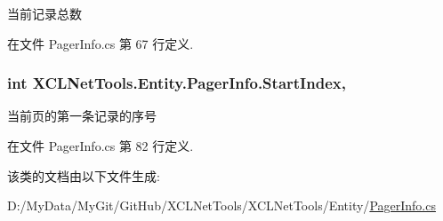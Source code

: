 当前记录总数 



在文件 Pager\-Info.\-cs 第 67 行定义.

\hypertarget{class_x_c_l_net_tools_1_1_entity_1_1_pager_info_a659b36bf635a3fed41ee3b82ec4c2cbe}{
\subsubsection[{Start\-Index}]{\setlength{\rightskip}{0pt plus 5cm}int X\-C\-L\-Net\-Tools.\-Entity.\-Pager\-Info.\-Start\-Index\hspace{0.3cm}{\ttfamily [get]}, {\ttfamily [set]}}}\label{class_x_c_l_net_tools_1_1_entity_1_1_pager_info_a659b36bf635a3fed41ee3b82ec4c2cbe}


当前页的第一条记录的序号 



在文件 Pager\-Info.\-cs 第 82 行定义.



该类的文档由以下文件生成\-:\begin{DoxyCompactItemize}
\item 
D\-:/\-My\-Data/\-My\-Git/\-Git\-Hub/\-X\-C\-L\-Net\-Tools/\-X\-C\-L\-Net\-Tools/\-Entity/\hyperlink{_pager_info_8cs}{Pager\-Info.\-cs}\end{DoxyCompactItemize}
